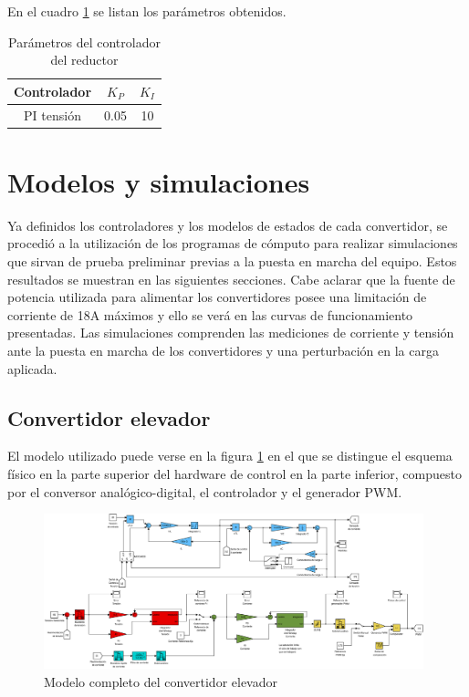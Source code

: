 En el cuadro \ref{tab:parametros_control_reductor} se listan los parámetros obtenidos.

\begin{table}[H]
  \centering
  \begin{tabular}{|c|c|c|}
    \hline 
    Controlador 	& $K_{P}$ 	& $K_{I}$\tabularnewline \hline \hline 
    PI tensión 		& 0.05 		& 10\tabularnewline \hline 
  \end{tabular}\caption{Parámetros del controlador del reductor}
  \label{tab:parametros_control_reductor}
\end{table}

\section{Modelos y simulaciones}
Ya definidos los controladores y los modelos de estados de cada convertidor, se procedió a la utilización de los programas de cómputo para realizar
simulaciones que sirvan de prueba preliminar previas a la puesta en marcha del equipo. Estos resultados se muestran en las siguientes secciones.
Cabe aclarar que la fuente de potencia utilizada para alimentar los convertidores posee una limitación de corriente de 18A máximos y ello se verá
en las curvas de funcionamiento presentadas. Las simulaciones comprenden las mediciones de corriente y tensión ante la puesta en marcha de los convertidores
y una perturbación en la carga aplicada.
\subsection{Convertidor elevador}
El modelo utilizado puede verse en la figura \ref{fig:modelo_elevador} en el que se distingue el esquema físico en la parte superior del hardware
de control en la parte inferior, compuesto por el conversor analógico-digital, el controlador y el generador PWM.

\begin{figure}[H]
  \centering
  \includegraphics[width=11cm]{gfx/modelo_elevador.eps}
  \caption{Modelo completo del convertidor elevador}
  \label{fig:modelo_elevador}
\end{figure}


